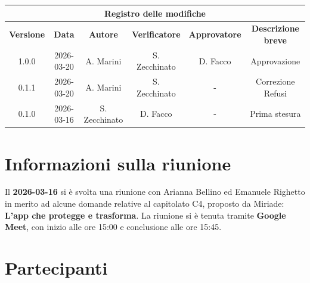 \documentclass[a4paper, 10pt, colorlinks=true, linkcolor=black, urlcolor=blue, citecolor=blue, hidelinks]{article}
\begin{document}
\newcommand{\tipoverbale}{esterno}
\newcommand{\dataverbale}{2026-03-16}
\newcommand{\dataversione}{2026-03-20}
\newcommand{\versione}{1.0.0}
\newcommand{\stato}{Approvato}
\newcommand{\destinatari}{The Bitless, prof. T. Vardanega, prof. R. Cardin, Miriade}




\newpage

\begin{center}
    \thispagestyle{empty}
    \begin{tabular}{|c|c|c|c|c|c|}
                    \hline
                    \multicolumn{6}{|c|}{\textbf{Registro delle modifiche}} \\
                    \hline
                    \textbf{Versione} & \textbf{Data} & \textbf{Autore}  & \textbf{Verificatore} & \textbf{Approvatore} & \textbf{Descrizione breve} \\
                    \hline
                    \versione & \dataversione & A. Marini & S. Zecchinato & D. Facco & Approvazione \\
                    \hline 
                    0.1.1 & 2026-03-20 & A. Marini & S. Zecchinato & - & Correzione Refusi \\
                    \hline 
                    0.1.0 & 2026-03-16 & S. Zecchinato &  D. Facco  & - & Prima stesura \\
                    \hline
                \end{tabular}
\end{center}

\newpage

\tableofcontents


\newpage
\section{Informazioni sulla riunione}
Il \textbf{2026-03-16} si è svolta una riunione con Arianna Bellino ed Emanuele Righetto in merito ad alcune domande relative al capitolato C4, proposto da Miriade: \textbf{L'app che protegge e trasforma}. La riunione si è tenuta tramite \textbf{Google Meet}, con inizio alle ore 15:00 e conclusione alle ore 15:45.

\section{Partecipanti}
\end{document}

